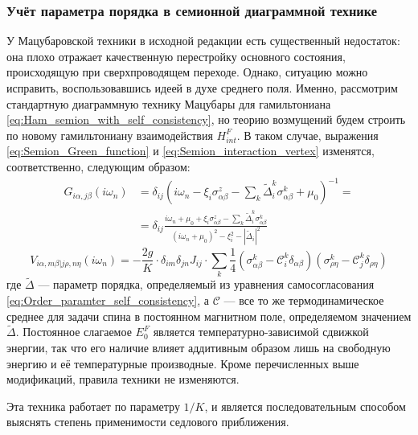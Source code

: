 \subsubsection{Учёт параметра порядка в семионной диаграммной технике}
У Мацубаровской техники в исходной редакции есть существенный недостаток: она плохо отражает  качественную перестройку основного состояния, происходящую при сверхпроводящем переходе. Однако, ситуацию можно исправить, воспользовавшись идеей в духе среднего поля. Именно, рассмотрим стандартную диаграммную технику Мацубары для гамильтониана \eqref{eq:Ham_semion_with_self_consistency}, но теорию возмущений будем строить по новому гамильтониану взаимодействия $H^F_{int}$. В таком случае, выражения \eqref{eq:Semion_Green_function} и \eqref{eq:Semion_interaction_vertex} изменятся, соответственно, следующим образом:
\begin{equation}
	\label{eq:Semion_Green_function_with_OP}
	\begin{split}
		G_{i\alpha,j\beta}(i\omega_n) & = \delta_{ij} \left( i\omega_n - \xi_i \sigma^z_{\alpha\beta} - \sum_k \widetilde{\Delta}^k_i \sigma^k_{\alpha\beta} + \mu_0 \right)^{-1} = \\ & = \delta_{ij} \frac{ i\omega_n +\mu_0 + \xi_i \sigma^z_{\alpha\beta} - \sum_k \widetilde{\Delta}^k_i \sigma^k_{\alpha\beta} }{ \left( i\omega_n +\mu_0 \right)^2 - \xi_i^2 - \left| \widetilde{\Delta}_i \right|^2 }
	\end{split}
\end{equation}
\begin{equation}
	\label{eq:Semion_interaction_vertex_with_OP}
		V_{i\alpha, m\beta|j\rho, n\eta}(i\omega_n) = - \frac{2 g}{K} \cdot \delta_{im} \delta_{jn} J_{ij} \cdot \sum_k \frac{1}{4} \left( \sigma^k_{\alpha \beta} - \mathcal{C}^k_i \delta_{\alpha\beta} \right) \left( \sigma^k_{\rho \eta} - \mathcal{C}^k_j \delta_{\rho\eta} \right)
\end{equation}
где $\widetilde{\Delta}$ --- параметр порядка, определяемый из уравнения самосогласования \eqref{eq:Order_paramter_self_consistency}, а $\mathcal{C}$ --- все то же термодинамическое среднее для задачи спина в постоянном магнитном поле, определяемом значением $\widetilde{\Delta}$. Постоянное слагаемое $E^F_0$ является температурно-зависимой сдвижкой энергии, так что его наличие влияет аддитивным образом лишь на свободную энергию и её температурные производные. Кроме перечисленных выше модификаций, правила техники не изменяются. 

Эта техника работает по параметру $1/K$, и является последовательным способом выяснять степень применимости седлового приближения.

